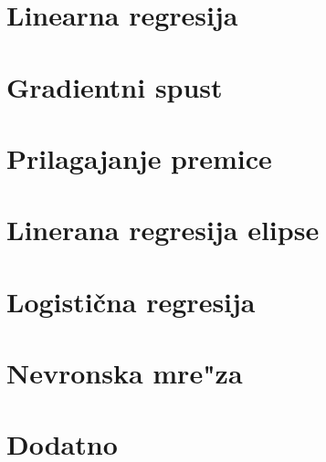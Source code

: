 \documentclass[a4paper, 12pt]{article}
\begin{document}
	\section*{Linearna regresija}
	

	\section*{Gradientni spust}
	
	
	\section*{Prilagajanje premice}
	

	\section*{Linerana regresija elipse}
	
	
	\section*{Logistična regresija}
	
	
	\section*{Nevronska mre"za}
	

	\section*{Dodatno}
	
\end{document}
